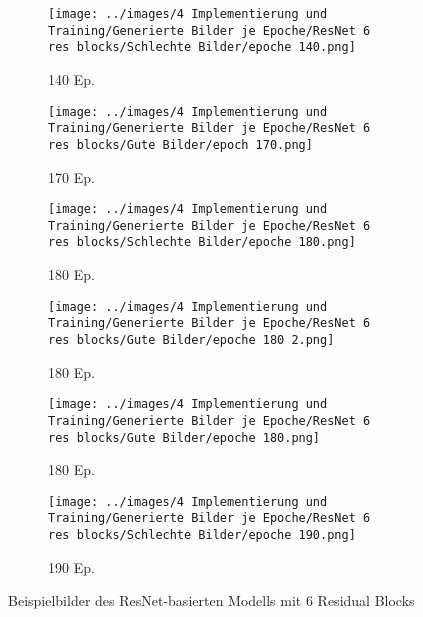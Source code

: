 \begin{figure}[H]
    \centering
    \begin{subfigure}[b]{0.12\textwidth}
        \centering
        \texttt{[image: ../images/4 Implementierung und Training/Generierte Bilder je Epoche/ResNet 6 res blocks/Schlechte Bilder/epoche 140.png]}
        \caption{140 Ep.}
    \end{subfigure}
    \hspace{1em}%
    \begin{subfigure}[b]{0.12\textwidth}
        \centering
        \texttt{[image: ../images/4 Implementierung und Training/Generierte Bilder je Epoche/ResNet 6 res blocks/Gute Bilder/epoch 170.png]}
        \caption{170 Ep.}
    \end{subfigure}
    \hspace{1em}%
    \begin{subfigure}[b]{0.12\textwidth}
        \centering
        \texttt{[image: ../images/4 Implementierung und Training/Generierte Bilder je Epoche/ResNet 6 res blocks/Schlechte Bilder/epoche 180.png]}
        \caption{180 Ep.}
    \end{subfigure}
    \hspace{1em}%
    \begin{subfigure}[b]{0.12\textwidth}
    \centering
    \texttt{[image: ../images/4 Implementierung und Training/Generierte Bilder je Epoche/ResNet 6 res blocks/Gute Bilder/epoche 180 2.png]}
    \caption{180 Ep.}
\end{subfigure}
\hspace{1em}%
    \begin{subfigure}[b]{0.12\textwidth}
    \centering
    \texttt{[image: ../images/4 Implementierung und Training/Generierte Bilder je Epoche/ResNet 6 res blocks/Gute Bilder/epoche 180.png]}
    \caption{180 Ep.}
\end{subfigure}
\hspace{1em}%
    \begin{subfigure}[b]{0.12\textwidth}
    \centering
    \texttt{[image: ../images/4 Implementierung und Training/Generierte Bilder je Epoche/ResNet 6 res blocks/Schlechte Bilder/epoche 190.png]}
    \caption{190 Ep.}
\end{subfigure}
        \caption{Beispielbilder des ResNet-basierten Modells mit 6 Residual Blocks}
        \label{fig:resnet-6-blocks}
\end{figure}
